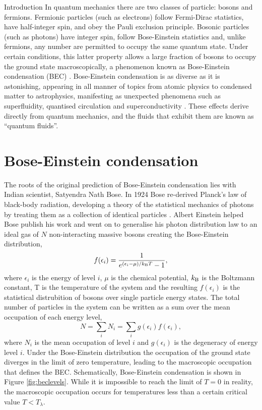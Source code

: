 \begin{chapter}{\label{cha:bose_gases}Introduction}
In quantum mechanics there are two classes of particle: bosons and fermions. Fermionic particles (such as electrons) follow Fermi-Dirac statistics, have half-integer spin, and obey the Pauli exclusion principle. Bosonic particles (such as photons) have integer spin, follow Bose-Einstein statistics and, unlike fermions, any number are permitted to occupy the same quantum state. Under certain conditions, this latter property allows a large fraction of bosons to occupy the ground state macroscopically, a phenomenon known as Bose-Einstein condensation (BEC) \cite{Pethick,stringari}. Bose-Einstein condensation is as diverse as it is astonishing, appearing in all manner of topics from atomic physics to condensed matter to astrophysics, manifesting as unexpected phenomena such as superfluidity, quantised circulation and superconductivity \cite{griffin1996bose,tilley1990superfluidity}. These effects derive directly from quantum mechanics, and the fluids that exhibit them are known as ``quantum fluids''.

\section{Bose-Einstein condensation}\label{section:becinintro}
The roots of the original prediction of Bose-Einstein condensation lies with Indian scientist, Satyendra Nath Bose. In 1924 Bose re-derived Planck's law of black-body radiation, developing a theory of the statistical mechanics of photons by treating them as a collection of identical particles \cite{bose}. Albert Einstein helped Bose publish his work and went on to generalise his photon distribution law to an ideal gas of $N$ non-interacting massive bosons \cite{Einstein24} creating the Bose-Einstein distribution,
\begin{equation}
	f(\epsilon_i) = \frac{1}{e^{(\epsilon_i - \mu) / k_{\rm B}T} - 1},
\end{equation}
where $\epsilon_i$ is the energy of level $i$, $\mu$ is the chemical potential, $k_{\rm B}$ is the Boltzmann constant, T is the temperature of the system and the resulting $f(\epsilon_i)$ is the statistical distrubition of bosons over single particle energy states. The total number of particles in the system can be written as a sum over the mean occupation of each energy level,
\begin{equation}
	N = \sum\limits_i N_i = \sum\limits_i g(\epsilon_i)f(\epsilon_i),
\end{equation}
where $N_i$ is the mean occupation of level $i$ and $g(\epsilon_i)$ is the degeneracy of energy level $i$. Under the Bose-Einstein distribution the occupation of the ground state diverges in the limit of zero temperature, leading to the macroscopic occupation that defines the BEC. Schematically, Bose-Einstein condensation is shown in Figure \ref{fig:beclevels}. While it is impossible to reach the limit of $T=0$ in reality, the macroscopic occupation occurs for temperatures less than a certain critical value $T<T_\lambda$.


\end{chapter}
